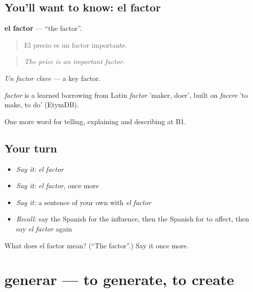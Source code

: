 \subsection*{You'll want to know: el factor}
\textbf{el factor} — \textquotedblleft{}the factor\textquotedblright{}.

\begin{quote}
El precio es un factor importante.
\end{quote}

\begin{quote}
\emph{The price is an important factor.}
\end{quote}

\emph{Un factor clave} — a key factor.

\begin{cousinweb}
\emph{factor} is a learned borrowing from Latin \emph{factor} 'maker, doer', built on \emph{facere} 'to make, to do' (EtymDB).
\end{cousinweb}

\begin{grammarlens}[title={What you've built}]
One more word for telling, explaining and describing at B1.
\end{grammarlens}

\subsection*{Your turn}
\begin{itemize}
\raggedright
  \item \emph{Say it:} \emph{el factor}
  \item \emph{Say it:} \emph{el factor}, once more
  \item \emph{Say it:} a sentence of your own with \emph{el factor}
  \item \emph{Recall:} say the Spanish for the influence, then the Spanish for to affect, then say \emph{el factor} again
\end{itemize}

\begin{tcolorbox}[breakable,colback=teal!4,colframe=teal!35!black,title={Before you move on}]
What does el factor mean? (\textquotedblleft{}The factor\textquotedblright{}.) Say it once more.
\end{tcolorbox}
\section[generar]{generar — to generate, to create}

